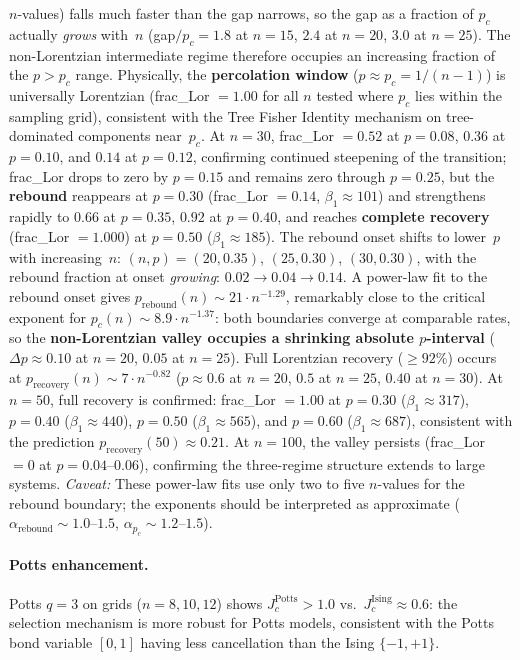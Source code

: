 \documentclass[11pt]{article}
\theoremstyle{definition}
\theoremstyle{remark}
\begin{document}
$n$-values) falls much faster than the gap narrows, so the gap as a
fraction of $p_c$ actually \emph{grows} with~$n$
(gap$/p_c = 1.8$ at $n = 15$, $2.4$ at $n = 20$, $3.0$ at $n = 25$).
The non-Lorentzian intermediate regime therefore occupies an
increasing fraction of the $p > p_c$ range.
Physically, the \textbf{percolation window} ($p \approx p_c = 1/(n-1)$)
is universally Lorentzian (frac\_Lor $= 1.00$ for all $n$ tested
where $p_c$ lies within the sampling grid), consistent with the
Tree Fisher Identity mechanism on tree-dominated components near~$p_c$.
At $n = 30$, frac\_Lor $= 0.52$ at $p = 0.08$,
$0.36$ at $p = 0.10$, and $0.14$ at $p = 0.12$, confirming continued
steepening of the transition; frac\_Lor drops to zero by $p = 0.15$ and
remains zero through $p = 0.25$, but the \textbf{rebound}
reappears at $p = 0.30$ (frac\_Lor $= 0.14$, $\beta_1 \approx 101$)
and strengthens rapidly to $0.66$ at $p = 0.35$, $0.92$ at $p = 0.40$,
and reaches \textbf{complete recovery} (frac\_Lor $= 1.000$) at
$p = 0.50$ ($\beta_1 \approx 185$).
The rebound onset shifts to lower~$p$ with increasing~$n$:
$(n,p) = (20, 0.35)$, $(25, 0.30)$, $(30, 0.30)$,
with the rebound fraction at onset \emph{growing}:
$0.02 \to 0.04 \to 0.14$.
A power-law fit to the rebound onset gives
$p_{\mathrm{rebound}}(n) \sim 21 \cdot n^{-1.29}$, remarkably close to the
critical exponent for $p_c(n) \sim 8.9 \cdot n^{-1.37}$:
both boundaries converge at comparable rates, so the
\textbf{non-Lorentzian valley occupies a shrinking absolute
$p$-interval} ($\Delta p \approx 0.10$ at $n = 20$, $0.05$ at $n = 25$).
Full Lorentzian recovery ($\geq 92\%$) occurs at
$p_{\mathrm{recovery}}(n) \sim 7 \cdot n^{-0.82}$ ($p \approx 0.6$
at $n = 20$, $0.5$ at $n = 25$, $0.40$ at $n = 30$).
At $n = 50$, full recovery is confirmed:
frac\_Lor $= 1.00$ at $p = 0.30$ ($\beta_1 \approx 317$),
$p = 0.40$ ($\beta_1 \approx 440$), $p = 0.50$
($\beta_1 \approx 565$), and $p = 0.60$
($\beta_1 \approx 687$),
consistent with the prediction $p_{\mathrm{recovery}}(50) \approx 0.21$.
At $n = 100$, the valley persists (frac\_Lor $= 0$ at $p = 0.04$--$0.06$),
confirming the three-regime structure extends to large systems.
\emph{Caveat:} These power-law fits use only two to five $n$-values for the
rebound boundary; the exponents should be interpreted as approximate
($\alpha_{\mathrm{rebound}} \sim 1.0$--$1.5$, $\alpha_{p_c} \sim 1.2$--$1.5$).

\paragraph{Potts enhancement.}
Potts $q = 3$ on grids ($n = 8, 10, 12$) shows $J_c^{\mathrm{Potts}} > 1.0$
vs.\ $J_c^{\mathrm{Ising}} \approx 0.6$: the selection mechanism is more
robust for Potts models, consistent with the Potts bond variable $[0,1]$
having less cancellation than the Ising $\{-1, +1\}$.
\end{document}
